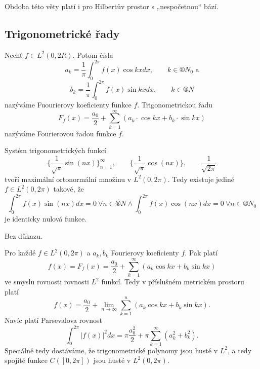 \documentclass[12pt]{article}					%
\begin{document}
	\begin{poznamka}
		Obdoba této věty platí i pro Hilbertův prostor s „nespočetnou“ bází.
	\end{poznamka}

	\subsection{Trigonometrické řady}
	\begin{definice}
		Nechť $f \in L^2(0, 2R)$. Potom čísla
		$$ a_k = \frac{1}{\pi} \int_0^{2\pi} f(x) \cos k x dx,\qquad k \in ®N_0 \text{ a} $$
		$$ b_k = \frac{1}{\pi} \int_0^{2\pi} f(x) \sin k x dx,\qquad k \in ®N $$
		nazýváme Fuourierovy koeficienty funkce $f$. Trigonometrickou řadu
		$$ F_f(x) = \frac{a_0}{2} + \sum_{k=1}^∞ (a_k · \cos k x + b_k · \sin k x) $$
		nazýváme Fourierovou řadou funkce $f$.
	\end{definice}

	\begin{veta}
		Systém trigonometrických funkcí
		$$ \{\frac{1}{\sqrt{\pi}} \sin(nx)\}_{n=1}^∞, \qquad \{\frac{1}{\sqrt{\pi}} \cos(nx)\}, \qquad \frac{1}{\sqrt{2\pi}} $$
		tvoří maximální ortonormální množinu v $L^2(0, 2\pi)$. Tedy existuje jediné $f \in L^2(0, 2\pi)$ takové, že
		$$ \int_0^{2\pi} f(x) \sin(n x) dx = 0\ \forall n \in ®N \land \int_0^{2\pi} f(x) \cos(n x) dx = 0\ \forall n \in ®N_0 $$
		je identicky nulová funkce.

		\begin{dukazin}
			Bez důkazu.
		\end{dukazin}
	\end{veta}

	\begin{dusledek}
		Pro každé $f \in L^2(0, 2\pi)$ a $a_k, b_k$ Fourierovy koeficienty $f$. Pak platí
		$$ f(x) = F_f(x) = \frac{a_0}{2} + \sum_{k=1}^∞(a_k \cos k x + b_k \sin k x) $$
		ve smyslu rovnosti rovnosti $L^2$ funkcí. Tedy v příslušném metrickém prostoru platí
		$$ f(x) = \frac{a_0}{2} + \lim_{n \rightarrow ∞} \sum_{k=1}^n (a_k \cos k x + b_k \sin k x). $$
		Navíc platí Parsevalova rovnost
		$$ \int_0^{2\pi} |f(x)|^2 dx = \pi \frac{a_0^2}{2} + \pi \sum_{k=1}^∞ (a_k^2 + b_k^2). $$
		Speciálně tedy dostáváme, že trigonometrické polynomy jsou husté v $L^2$, a tedy spojité funkce $C([0, 2\pi])$ jsou husté v $L^2(0, 2\pi)$.
	\end{dusledek}

\end{document}
